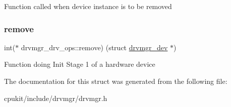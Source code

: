 Function called when device instance is to be removed \mbox{\label{structdrvmgr__drv__ops_afa653aa2b8ab4a45b08d7c7a14aa1151}} 
\subsubsection{\texorpdfstring{remove}{remove}}
{\footnotesize\ttfamily int($\ast$ drvmgr\+\_\+drv\+\_\+ops\+::remove) (struct \mbox{\hyperlink{structdrvmgr__dev}{drvmgr\+\_\+dev}} $\ast$)}

Function doing Init Stage 1 of a hardware device 

The documentation for this struct was generated from the following file\+:\begin{DoxyCompactItemize}
\item 
cpukit/include/drvmgr/drvmgr.\+h\end{DoxyCompactItemize}
